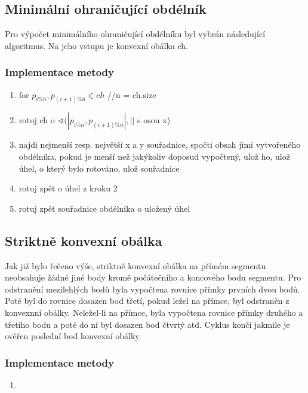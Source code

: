 \documentclass[a4paper, 12pt]{article}
\begin{document}
\subsection{Minimální ohraničující obdélník}
Pro výpočet minimálního ohraničující obdélníku byl vybrán následující algoritmus. Na jeho vstupu je konvexní obálka ch.

\subsubsection{Implementace metody}
\begin{enumerate}

	\item for $p_{i\%n}, p_{(i+1)\%n} \in ch$ //n = ch.size
	\item \hspace{1cm} rotuj ch o $\sphericalangle (|p_{i\%n}, p_{(i+1)\%n}| , ||$ s osou x)
	\item \hspace{1cm} najdi nejmenší resp. největší x a y souřadnice, spočti obsah jimi vytvořeného obdélníka, pokud je menší než jakýkoliv doposud vypočtený, ulož ho, ulož úhel, o který bylo rotováno, ulož souřadnice 
	\item \hspace{1cm} rotuj zpět o úhel z kroku 2
	\item rotuj zpět souřadnice obdélníka o uložený úhel	
	
\end{enumerate}

\vspace{1,5cm}


\subsection{Striktně konvexní obálka}
Jak již bylo řečeno výše, striktně konvexní obálka na přímém segmentu neobsahuje žádné jiné body kromě počátečního a koncového bodu segmentu. Pro odstranění mezilehlých bodů byla vypočtena rovnice přímky prvních dvou bodů. Poté byl do rovnice dosazen bod třetí, pokud ležel na přímce, byl odstraněn z konvexnní obálky. Neležel-li na přímce, byla vypočtena rovnice přímky druhého a třetího bodu a poté do ní byl dosazen bod čtvrtý atd. Cyklus končí jakmile je ověřen poslední bod konvexní obálky.

\subsubsection{Implementace metody}
\begin{enumerate}
	
	\item 	
	
\end{enumerate}
\end{document}
